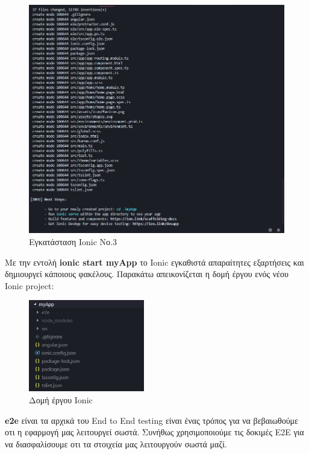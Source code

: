 \documentclass[a4paper,12pt]{article}
\begin{document}
				\begin{figure}[!htb]
					\begin{center}
						\caption{Εγκατάσταση Ionic Νο.3}
						\vspace*{0.5cm}
						\includegraphics[width=\linewidth]{ionic3} 
					\end{center}
				\end{figure}
				\clearpage

				Με την εντολή \textbf{ionic start myApp} το Ionic εγκαθιστά απαραίτητες εξαρτήσεις και δημιουργεί κάποιους φακέλους.
				Παρακάτω απεικονίζεται η δομή έργου ενός νέου Ionic project:
		
				\setlength\intextsep{0pt}
				\vspace*{1cm}
				\begin{figure}
					\caption{Δομή έργου Ionic}
					\vspace*{0.5cm}
					\includegraphics[width=0.45\textwidth]{ionic4}
					
				\end{figure}
					\textbf{e2e} είναι τα αρχικά του End to End testing είναι ένας τρόπος για να βεβαιωθούμε οτι η εφαρμογή 
					 μας λειτουργεί σωστά. Συνήθως χρησιμοποιούμε τις δοκιμές E2E για να διασφαλίσουμε οτι τα στοιχεία μας
					 λειτουργούν σωστά μαζί.
\end{document}

